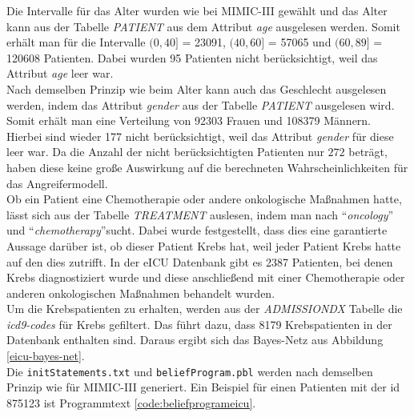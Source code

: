 \documentclass[german,version-2020-11]{uzl-thesis}
\begin{document}
Die Intervalle für das Alter wurden wie bei MIMIC-III gewählt und das Alter kann aus der Tabelle \textit{PATIENT} aus dem Attribut \textit{age} ausgelesen werden. Somit erhält man für die Intervalle  $(0,40]$ = 23091,  $(40,60]$ = 57065 und $(60,89]$ = 120608 Patienten. Dabei wurden 95 Patienten nicht berücksichtigt, weil das Attribut \textit{age} leer war.\\ 
Nach demselben Prinzip wie beim Alter kann auch das Geschlecht ausgelesen werden, indem das Attribut \textit{gender} aus der Tabelle \textit{PATIENT} ausgelesen wird. Somit erhält man eine Verteilung von 92303 Frauen und 108379 Männern. Hierbei sind wieder 177 nicht berücksichtigt, weil das Attribut \textit{gender} für diese leer war. Da die Anzahl der nicht berücksichtigten Patienten nur $272$ beträgt, haben diese keine große Auswirkung auf die berechneten Wahrscheinlichkeiten für das Angreifermodell.\\
Ob ein Patient eine Chemotherapie oder andere onkologische Maßnahmen hatte, lässt sich aus der Tabelle \textit{TREATMENT } auslesen, indem man nach \enquote{\textit{oncology}} und  \enquote{\textit{chemotherapy}}sucht. Dabei wurde festgestellt, dass dies eine garantierte Aussage darüber ist, ob dieser Patient Krebs hat, weil jeder Patient Krebs hatte auf den dies zutrifft. In der eICU Datenbank gibt es 2387 Patienten, bei denen Krebs diagnostiziert wurde und diese anschließend mit einer Chemotherapie oder anderen onkologischen Maßnahmen behandelt wurden. \\ 
Um die  Krebspatienten zu erhalten, werden aus der \textit{ADMISSIONDX} Tabelle die \textit{icd9-codes} für Krebs gefiltert. Das führt dazu, dass 8179 Krebspatienten in der Datenbank enthalten sind. 
Daraus ergibt sich das Bayes-Netz aus Abbildung \ref{eicu-bayes-net}. \\ 
Die \texttt{initStatements.txt} und \texttt{beliefProgram.pbl} werden nach demselben Prinzip wie für MIMIC-III generiert. Ein Beispiel für einen Patienten mit der id 875123 ist Programmtext \ref{code:beliefprogrameicu}.
\end{document}
